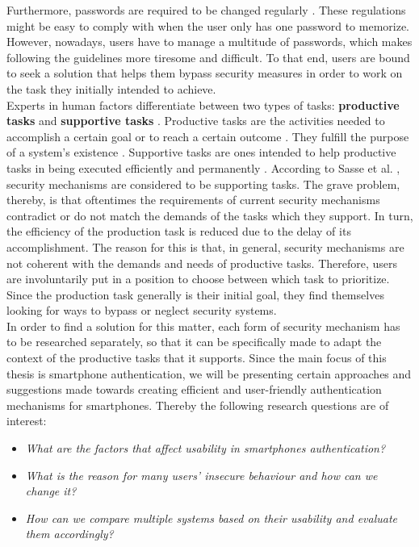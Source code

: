 Furthermore, passwords are required to be changed regularly \cite{adams2,gorman}. These regulations might be easy to comply with when the user only has one password to memorize. However, nowadays, users have to manage a multitude of passwords, which makes following the guidelines more tiresome and difficult. To that end, users are bound to seek a solution that helps them bypass security measures in order to work on the task they initially intended to achieve.\\

Experts in human factors differentiate between two types of tasks: \textbf{productive tasks} and \textbf{supportive tasks} \cite{sasse}. Productive tasks are the activities needed to accomplish a certain goal or to reach a certain outcome \cite{sasse}. They fulfill the purpose of a system's existence \cite{sasse}. Supportive tasks are ones intended to help productive tasks in being executed efficiently and permanently \cite{sasse}. According to Sasse et al. \cite{sasse}, security mechanisms are considered to be supporting tasks. The grave problem, thereby, is that oftentimes the requirements of current security mechanisms contradict or do not match the demands of the tasks which they support. In turn, the efficiency of the production task is reduced due to the delay of its accomplishment. The reason for this is that, in general, security mechanisms are not coherent with the demands and needs of productive tasks. Therefore, users are involuntarily put in a position to choose between which task to prioritize. Since the production task generally is their initial goal, they find themselves looking for ways to bypass or neglect security systems.\\

In order to find a solution for this matter, each form of security mechanism has to be researched separately, so that it can be specifically made to adapt the context of the productive tasks that it supports. Since the main focus of this thesis is smartphone authentication, we will be presenting certain approaches and suggestions made towards creating efficient and user-friendly authentication mechanisms for smartphones. Thereby the following research questions are of interest: 


\begin{itemize}
    \item \textit{What are the factors that affect usability in smartphones authentication?}
\item \textit{What is the reason for many users' insecure behaviour and how can we change it?} 
    \item \textit{How can we compare multiple systems based on their usability and evaluate them accordingly?}
\end{itemize}

